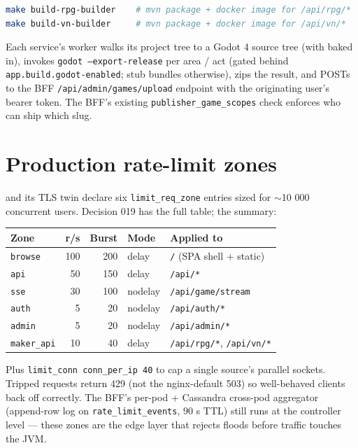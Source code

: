 \begin{lstlisting}[language=bash]
make build-rpg-builder    # mvn package + docker image for /api/rpg/*
make build-vn-builder     # mvn package + docker image for /api/vn/*
\end{lstlisting}

Each service's worker walks its project tree to a Godot 4 source tree
(with  baked in), invokes
\texttt{godot --export-release} per area / act (gated behind
\texttt{app.build.godot-enabled}; stub bundles otherwise), zips the
result, and POSTs to the BFF \texttt{/api/admin/games/upload} endpoint
with the originating user's bearer token. The BFF's existing
\texttt{publisher\_game\_scopes} check enforces who can ship which
slug.

\section{Production rate-limit zones}

 and its TLS twin
 declare six
\texttt{limit\_req\_zone} entries sized for $\sim$10 000 concurrent
users. Decision 019 has the full table; the summary:

\begin{tabularx}{\linewidth}{l r r l X}
\toprule
\textbf{Zone} & \textbf{r/s} & \textbf{Burst} & \textbf{Mode} & \textbf{Applied to} \\
\midrule
\texttt{browse}    & 100 & 200 & delay   & \texttt{/} (SPA shell + static) \\
\texttt{api}       & 50  & 150 & delay   & \texttt{/api/*} \\
\texttt{sse}       & 30  & 100 & nodelay & \texttt{/api/game/stream} \\
\texttt{auth}      & 5   & 20  & nodelay & \texttt{/api/auth/*} \\
\texttt{admin}     & 5   & 20  & nodelay & \texttt{/api/admin/*} \\
\texttt{maker\_api} & 10  & 40  & delay   & \texttt{/api/rpg/*}, \texttt{/api/vn/*} \\
\bottomrule
\end{tabularx}

Plus \texttt{limit\_conn conn\_per\_ip 40} to cap a single source's
parallel sockets. Tripped requests return 429 (not the nginx-default
503) so well-behaved clients back off correctly. The BFF's per-pod
 + Cassandra cross-pod aggregator
(append-row log on \texttt{rate\_limit\_events}, 90 s TTL) still runs
at the controller level --- these zones are the edge layer that
rejects floods before traffic touches the JVM.

